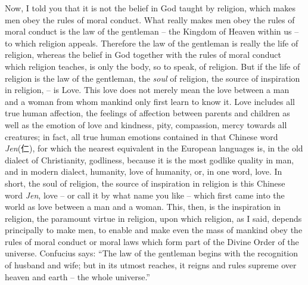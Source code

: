 Now, I told you that it is not the belief in God taught by religion, which makes men obey the rules of moral conduct. What really makes men obey the rules of moral conduct is the law of the gentleman
-- the Kingdom of Heaven within us
-- to which religion appeals.
Therefore the law of the gentleman is really the life of religion, whereas the belief in God together with the rules of moral conduct which religion teaches,
is only the body, so to speak, of religion.
But if the life of religion is the law of the gentleman, the \emph{soul} of religion, the source of inspiration in religion,  -- is Love.
This love does not merely mean the love between a man and a woman from whom mankind only first learn to know it.
Love includes all true human affection, the feelings of affection between parents and children as well as the emotion of love and kindness, pity, compassion, mercy towards all creatures;
in fact, all true human emotions contained in that Chinese word \emph{Jen}(仁), for which the nearest equivalent in the European languages is, in the old dialect of Christianity, godliness, because it is the most godlike quality in man, and in modern dialect, humanity, love of humanity, or, in one word, love.
In short, the soul of religion, the source of inspiration in religion is this Chinese word \emph{Jen}, love -- or call it by what name you like -- which first came into the world as love between a man and a woman.
This, then, is the inspiration in religion, the paramount virtue in religion, upon which religion, as I said, depends principally to make men, to enable and make even the mass of mankind obey the rules of moral conduct or moral laws which form part of the Divine Order of the universe.
Confucius says: ``The law of the gentleman begins with the recognition of husband and wife; but in its utmost reaches, it reigns and rules supreme over heaven and earth -- the whole universe.''

